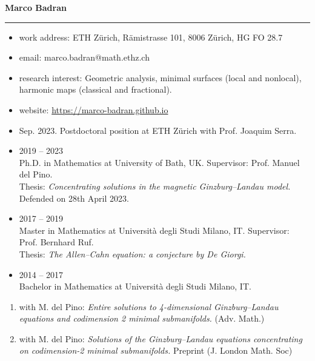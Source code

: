 \documentclass[12pt]{amsart}
\begin{document}
\begin{center}{\large{\bf Marco Badran}}\end{center}
\noindent\rule{\textwidth}{.8pt}
\medskip\bigskip

\begin{itemize}
	\item {work address}: {ETH Z\"urich, R\"amistrasse 101, 8006 Z\"urich, HG FO 28.7}
	\item {email}: marco.badran@math.ethz.ch
	\item {research interest}: Geometric analysis, minimal surfaces (local and nonlocal), harmonic maps (classical and fractional).
	\item {website}:  {\color{blue} \url{https://marco-badran.github.io}}
\end{itemize}

\bigskip\medskip
{}
\begin{itemize}
	\item {Sep. 2023.} Postdoctoral position at ETH Z\"urich with Prof. Joaquim Serra.
\end{itemize}

\bigskip\medskip
{}
\begin{itemize}
	\item {2019 -- 2023}\\ 
		Ph.D. in Mathematics at University of Bath, UK. Supervisor: Prof. Manuel del Pino.\\
		Thesis: \emph{Concentrating solutions in the magnetic Ginzburg--Landau model.}
		Defended on 28th April 2023.
	
	\medskip
	
	\item {2017 -- 2019}\\  Master in Mathematics at Universit\`a degli Studi Milano, IT. Supervisor: Prof. Bernhard Ruf. \\
		Thesis: \emph{The Allen--Cahn equation: a conjecture by De Giorgi.}
	
	\medskip
	
	\item {2014 -- 2017}\\  Bachelor in Mathematics at Universit\`a degli Studi Milano, IT.
\end{itemize}

\bigskip\medskip
{}
\begin{enumerate}
	\item with M. del Pino:
		\emph{Entire solutions to 4-dimensional Ginzburg--Landau equations and codimension 2 minimal submanifolds.} (Adv. Math.)
	\item with M. del Pino: \emph{Solutions of the Ginzburg--Landau equations concentrating on codimension-2 minimal submanifolds.} Preprint (J. London Math. Soc)
\end{enumerate}
\end{document}
